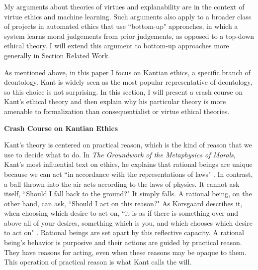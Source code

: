 \begin{isabellebody}
\begin{isamarkuptext}
My arguments about theories of virtues and explanability are in the context of virtue ethics and 
machine learning. Such arguments also apply to a broader class of projects in automated ethics 
that use ``bottom-up" approaches, in which a system learns moral judgements from prior judgements, as 
opposed to a top-down ethical theory. I will extend this argument to bottom-up approaches more
generally in Section Related Work.%
\end{isamarkuptext}\isamarkuptrue%
%
\isadelimdocument
%
\endisadelimdocument
%
\isatagdocument
%
\isamarkuptrue%
%
\endisatagdocument
{\isafolddocument}%
%
\isadelimdocument
%
\endisadelimdocument
%
\begin{isamarkuptext}%
As mentioned above, in this paper I focus on Kantian ethics, a specific branch of deontology. 
Kant is widely seen as the most popular representative of deontology, so this choice is not surprising. 
In this section, I will present a crash course on Kant's ethical theory and then explain why his particular
theory is more amenable to formalization than consequentialist or virtue ethical theories.%
\end{isamarkuptext}\isamarkuptrue%
%
\begin{isamarkuptext}%
\textbf{Crash Course on Kantian Ethics}%
\end{isamarkuptext}\isamarkuptrue%
%
\begin{isamarkuptext}%
Kant's theory is centered on practical reason, which is the kind of reason that we 
use to decide what to do. In \emph{The Groundwork of the Metaphysics of Morals}, Kant's most influential 
text on ethics, he explains that rational beings are unique because we can act ``in accordance with 
the representations of laws" \cite[4:412]{groundwork}. In contrast, a ball thrown into the air acts 
according to the laws of physics. It cannot ask itself, ``Should I fall back to the ground?" 
It simply falls. A rational being, on the other hand, can ask, ``Should I act on this reason?" 
As Korsgaard describes it, when choosing which desire to act on, ``it is as if there is something over 
and above all of your desires, something which is you, and which chooses which desire to act on" \cite[100]{sources}. 
Rational beings are set apart by this reflective capacity. A rational being's behavior is purposive and 
their actions are guided by practical reason. They have reasons for acting, even when these reasons may be 
opaque to them. This operation of practical reason is what Kant calls the will. 


\end{isamarkuptext}
\end{isabellebody}
